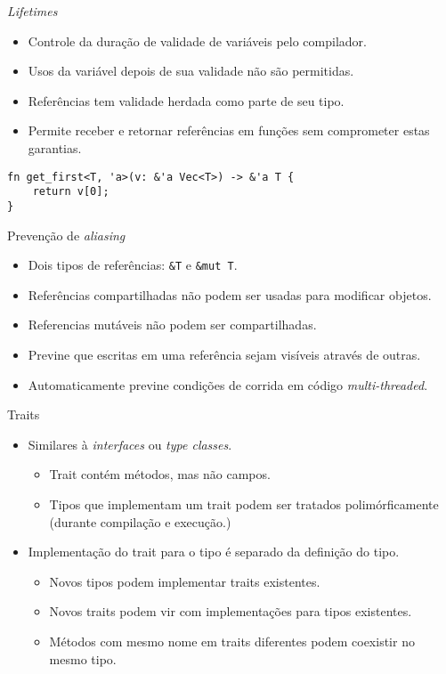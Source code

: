\documentclass{beamer}
\begin{document}
\begin{frame}[fragile]{\emph{Lifetimes}}
	\begin{itemize}
		\item Controle da duração de validade de variáveis pelo compilador.
		\item Usos da variável depois de sua validade não são permitidas.
		\item Referências tem validade herdada como parte de seu tipo.
		\item Permite receber e retornar referências em funções sem comprometer estas garantias.
	\end{itemize}

	\begin{lstlisting}
fn get_first<T, 'a>(v: &'a Vec<T>) -> &'a T {
    return v[0];
}
	\end{lstlisting}
\end{frame}

\begin{frame}{Prevenção de \emph{aliasing}}
	\begin{itemize}
		\item Dois tipos de referências: \texttt{\&T} e \texttt{\&mut T}.
		\item Referências compartilhadas não podem ser usadas para modificar objetos.
		\item Referencias mutáveis não podem ser compartilhadas.
		\item Previne que escritas em uma referência sejam visíveis através de outras.
		\item Automaticamente previne condições de corrida em código \emph{multi-threaded}.
	\end{itemize}
\end{frame}

\begin{frame}{Traits}
	\begin{itemize}
		\item Similares à \emph{interfaces} ou \emph{type classes}.
		\begin{itemize}
			\item Trait contém métodos, mas não campos.
			\item Tipos que implementam um trait podem ser tratados polimórficamente (durante compilação e execução.)
		\end{itemize}
		\item Implementação do trait para o tipo é separado da definição do tipo.
		\begin{itemize}
			\item Novos tipos podem implementar traits existentes.
			\item Novos traits podem vir com implementações para tipos existentes.
			\item Métodos com mesmo nome em traits diferentes podem coexistir no mesmo tipo.
		\end{itemize}
	\end{itemize}
\end{frame}
\end{document}
